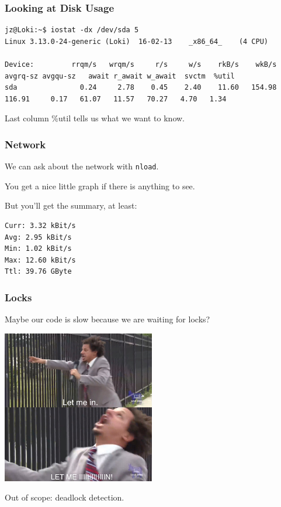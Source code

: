\begin{frame}[fragile]
\frametitle{Looking at Disk Usage}

{\tiny
\begin{verbatim}
jz@Loki:~$ iostat -dx /dev/sda 5 
Linux 3.13.0-24-generic (Loki) 	16-02-13 	_x86_64_	(4 CPU)

Device:         rrqm/s   wrqm/s     r/s     w/s    rkB/s    wkB/s avgrq-sz avgqu-sz   await r_await w_await  svctm  %util
sda               0.24     2.78    0.45    2.40    11.60   154.98   116.91     0.17   61.07   11.57   70.27   4.70   1.34
\end{verbatim}
}


\begin{changemargin}{1cm}
Last column \%util tells us what we want to know.
\end{changemargin}

\end{frame}



\begin{frame}[fragile]
\frametitle{Network}


\begin{changemargin}{1cm}
We can ask about the network with \texttt{nload}. 
 
You get a nice little graph if there is anything to see. 

But you'll get the summary, at least:

\begin{verbatim}
Curr: 3.32 kBit/s
Avg: 2.95 kBit/s
Min: 1.02 kBit/s
Max: 12.60 kBit/s
Ttl: 39.76 GByte                                                                                       \end{verbatim}
\end{changemargin}
\end{frame}


\begin{frame}
\frametitle{Locks}

Maybe our code is slow because we are waiting for locks?

\begin{center}
	\includegraphics[width=0.5\textwidth]{images/letmein.png}
\end{center}

Out of scope: deadlock detection.

\end{frame}



